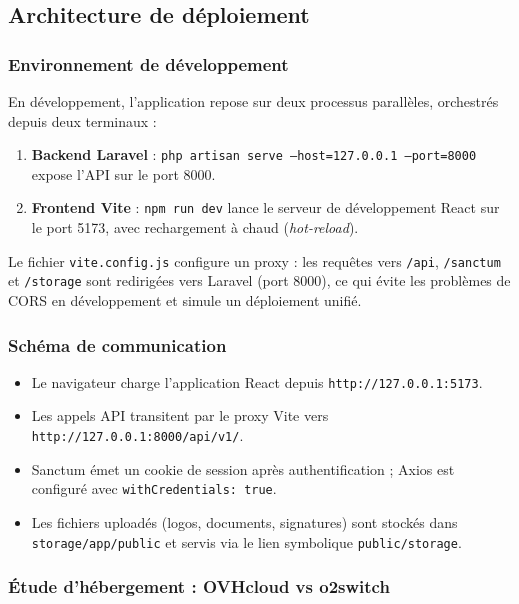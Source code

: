 \subsection{Architecture de déploiement}

\subsubsection{Environnement de développement}

En développement, l'application repose sur deux processus parallèles, orchestrés depuis
deux terminaux :

\begin{enumerate}
  \item \textbf{Backend Laravel} : \texttt{php artisan serve --host=127.0.0.1 --port=8000}
  expose l'API sur le port 8000.
  \item \textbf{Frontend Vite} : \texttt{npm run dev} lance le serveur de développement
  React sur le port 5173, avec rechargement à chaud (\textit{hot-reload}).
\end{enumerate}

Le fichier \texttt{vite.config.js} configure un proxy : les requêtes vers \texttt{/api},
\texttt{/sanctum} et \texttt{/storage} sont redirigées vers Laravel (port 8000), ce qui
évite les problèmes de CORS en développement et simule un déploiement unifié.

\subsubsection{Schéma de communication}

\begin{itemize}
  \item Le navigateur charge l'application React depuis \texttt{http://127.0.0.1:5173}.
  \item Les appels API transitent par le proxy Vite vers \texttt{http://127.0.0.1:8000/api/v1/}.
  \item Sanctum émet un cookie de session après authentification ; Axios est configuré
  avec \texttt{withCredentials: true}.
  \item Les fichiers uploadés (logos, documents, signatures) sont stockés dans
  \texttt{storage/app/public} et servis via le lien symbolique \texttt{public/storage}.
\end{itemize}

\subsubsection{Étude d'hébergement : OVHcloud vs o2switch}

